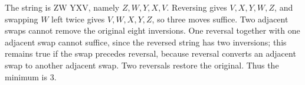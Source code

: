 The string is ZW YXV, namely $ Z,W,Y,X,V $. Reversing gives $ V,X,Y,W,Z $, and swapping $ W $ left twice gives $ V,W,X,Y,Z $, so three moves suffice. Two adjacent swaps cannot remove the original eight inversions. One reversal together with one adjacent swap cannot suffice, since the reversed string has two inversions; this remains true if the swap precedes reversal, because reversal converts an adjacent swap to another adjacent swap. Two reversals restore the original. Thus the minimum is $\boxed3 $.
